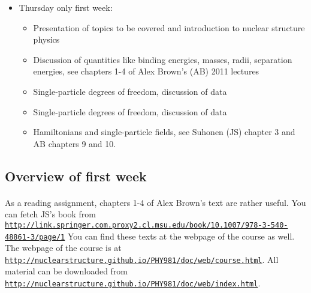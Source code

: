 \documentclass[%
twoside,                 %
final,                   %
10pt]{article}
\begin{document}
\begin{itemize}
\item Thursday only first week:
\begin{itemize}

 \item Presentation of topics to be covered and introduction to nuclear structure physics

 \item Discussion of quantities like binding energies, masses, radii, separation energies, see chapters 1-4 of Alex Brown's (AB) 2011 lectures

 \item Single-particle degrees of freedom, discussion of data

 \item Single-particle degrees of freedom, discussion of data

 \item Hamiltonians and single-particle fields, see  Suhonen (JS) chapter 3  and AB chapters 9 and 10.
\end{itemize}

\noindent
\end{itemize}

\noindent




\subsection{Overview of first week}

\paragraph{}
As a reading assignment, chapters 1-4 of Alex Brown's text are rather useful.
You can fetch JS's book from \href{{http://link.springer.com.proxy2.cl.msu.edu/book/10.1007/978-3-540-48861-3/page/1}}{\nolinkurl{http://link.springer.com.proxy2.cl.msu.edu/book/10.1007/978-3-540-48861-3/page/1}}
You can find these texts at the webpage of the course as well.
The webpage of the course is at \href{{http://nuclearstructure.github.io/PHY981/doc/web/course.html}}{\nolinkurl{http://nuclearstructure.github.io/PHY981/doc/web/course.html}}.
All material can be downloaded from \href{{http://nuclearstructure.github.io/PHY981/doc/web/index.html}}{\nolinkurl{http://nuclearstructure.github.io/PHY981/doc/web/index.html}}.
\end{document}
